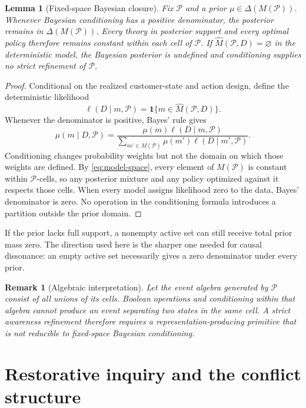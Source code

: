 \documentclass[11pt]{article}
\newtheorem{lemma}[assumption]{Lemma}
\newtheorem{remark}[assumption]{Remark}
\newcommand{\emptysetset}{\varnothing}
\newcommand{\ind}{\mathbf 1}
\begin{document}
\begin{lemma}[Fixed-space Bayesian closure]
\label{lem:bayesian-closure}
Fix $\mathcal P$ and a prior $\mu\in\Delta(M(\mathcal P))$.  Whenever Bayesian
conditioning has a positive denominator, the posterior remains in
$\Delta(M(\mathcal P))$.  Every theory in posterior support and every optimal
policy therefore remains constant within each cell of $\mathcal P$.  If
$\widehat M(\mathcal P,D)=\emptysetset$ in the deterministic model, the Bayesian
posterior is undefined and conditioning supplies no strict refinement of
$\mathcal P$.
\end{lemma}

\begin{proof}
Conditional on the realized customer-state and action design, define the
deterministic likelihood
\[
\ell(D\mid m,\mathcal P)
=
\ind\{m\in\widehat M(\mathcal P,D)\}.
\]
Whenever the denominator is positive, Bayes' rule gives
\[
\mu(m\mid D,\mathcal P)
=
\frac{\mu(m)\ell(D\mid m,\mathcal P)}
{\sum_{m'\in M(\mathcal P)}
\mu(m')\ell(D\mid m',\mathcal P)}.
\]
Conditioning changes probability weights but not the domain on which those
weights are defined.  By \cref{eq:model-space}, every element of
$M(\mathcal P)$ is constant within $\mathcal P$-cells, so any posterior mixture
and any policy optimized against it respects those cells.  When every model
assigns likelihood zero to the data, Bayes' denominator is zero.  No operation
in the conditioning formula introduces a partition outside the prior domain.
\end{proof}

If the prior lacks full support, a nonempty active set can still receive total
prior mass zero.  The direction used here is the sharper one needed for causal
dissonance: an empty active set necessarily gives a zero denominator under
every prior.

\begin{remark}[Algebraic interpretation]
Let the event algebra generated by $\mathcal P$ consist of all unions of its
cells.  Boolean operations and conditioning within that algebra cannot produce
an event separating two states in the same cell.  A strict awareness refinement
therefore requires a representation-producing primitive that is not reducible
to fixed-space Bayesian conditioning.
\end{remark}

\section{Restorative inquiry and the conflict structure}
\end{document}
